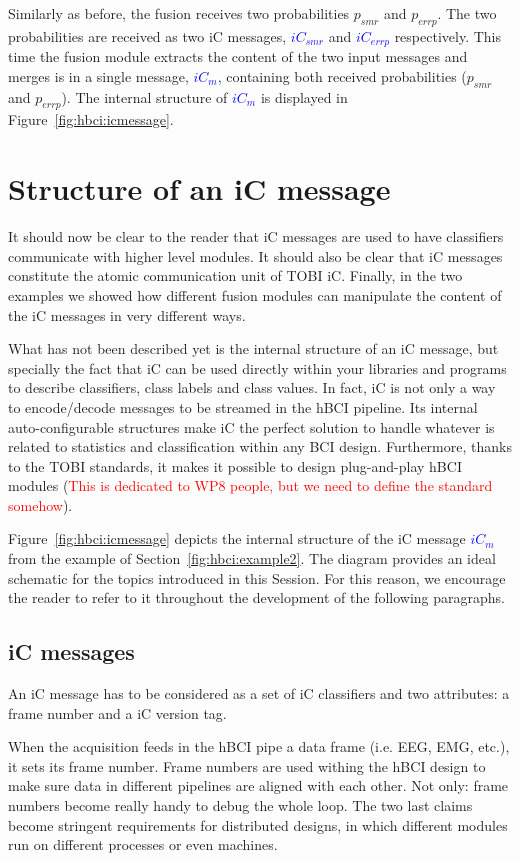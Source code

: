\documentclass[a4paper,10pt]{article}
\newcommand{\temp}[1]{\textcolor{blue}{\textbf{#1}}}
\newcommand{\note}[1]{\textcolor{red}{#1}}
\begin{document}
Similarly as before, the fusion receives two probabilities $p_{smr}$ and
$p_{errp}$. The two probabilities are received as two iC messages, 
\temp{$iC_{smr}$} and \temp{$iC_{errp}$} respectively.
This time the fusion module extracts the content of the two input messages and
merges is in a single message, \temp{$iC_{m}$}, containing both received
probabilities ($p_{smr}$ and $p_{errp}$).
The internal structure of \temp{$iC_{m}$} is displayed in
Figure~\ref{fig:hbci:icmessage}.

\section{Structure of an iC message}
\label{sec:icstructure}
It should now be clear to the reader that iC messages are used to have
classifiers communicate with higher level modules. It should also be clear that
iC messages constitute the atomic communication unit of TOBI iC.
Finally, in the two examples we showed how different fusion modules can
manipulate the content of the iC messages in very different ways.

What has not been described yet is the internal structure of an iC message, but
specially the fact that iC can be used directly within your libraries and
programs to describe classifiers, class labels and class values.
In fact, iC is not only a way to encode/decode messages to be streamed in the
hBCI pipeline. Its internal auto-configurable structures make iC the perfect
solution to handle whatever is related to statistics and classification within
any BCI design.
Furthermore, thanks to the TOBI standards, it makes it possible to design
plug-and-play hBCI modules (\note{This is dedicated to WP8 people, but we need
to define the standard somehow}).

Figure~\ref{fig:hbci:icmessage} depicts the internal structure of the iC message
\temp{$iC_{m}$} from the example of Section~\ref{fig:hbci:example2}. 
The diagram provides an ideal schematic for the topics introduced in this
Session. For this reason, we encourage the reader to refer to it throughout the
development of the following paragraphs.

\subsection{iC messages}
\label{sec:icmessage}
An iC message has to be considered as a set of iC classifiers and two
attributes: a frame number and a iC version tag.

When the acquisition feeds in the hBCI pipe a data frame (i.e. EEG, EMG,
etc.), it sets its frame number. Frame numbers are used withing the hBCI design
to make sure data in different pipelines are aligned with each other. 
Not only: frame numbers become really handy to debug the whole loop.
The two last claims become stringent requirements for distributed designs, in
which different modules run on different processes or even machines.
\end{document}
